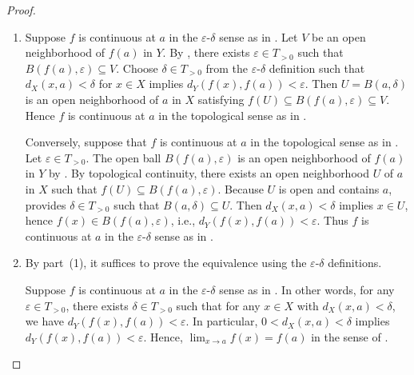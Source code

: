 \begin{proof}
    \begin{enumerate}
        \item Suppose $f$ is continuous at $a$ in the $\varepsilon$-$\delta$ sense as in . Let $V$ be an open neighborhood of $f(a)$ in $Y$. By , there exists $\varepsilon \in T_{>0}$ such that $B(f(a), \varepsilon) \subseteq V$. Choose $\delta \in T_{>0}$ from the $\varepsilon$-$\delta$ definition such that $d_X(x,a) < \delta$ for $x \in X$ implies $d_Y(f(x), f(a)) < \varepsilon$. Then $U = B(a, \delta)$ is an open neighborhood of $a$ in $X$ satisfying $f(U) \subseteq B(f(a), \varepsilon) \subseteq V$. Hence $f$ is continuous at $a$ in the topological sense as in .

        Conversely, suppose that $f$ is continuous at $a$ in the topological sense as in . Let $\varepsilon \in T_{>0}$. The open ball $B(f(a), \varepsilon)$ is an open neighborhood of $f(a)$ in $Y$ by . By topological continuity, there exists an open neighborhood $U$ of $a$ in $X$ such that $f(U) \subseteq B(f(a), \varepsilon)$. Because $U$ is open and contains $a$,  provides $\delta \in T_{>0}$ such that $B(a, \delta) \subseteq U$. Then $d_X(x,a) < \delta$ implies $x \in U$, hence $f(x) \in B(f(a), \varepsilon)$, i.e., $d_Y(f(x), f(a)) < \varepsilon$. Thus $f$ is continuous at $a$ in the $\varepsilon$-$\delta$ sense as in .

        \item By part~(1), it suffices to prove the equivalence using the $\varepsilon$-$\delta$ definitions.

        Suppose $f$ is continuous at $a$ in the $\varepsilon$-$\delta$ sense as in . In other words, for any $\varepsilon \in T_{>0}$, there exists $\delta \in T_{>0}$ such that for any $x \in X$ with $d_X(x,a) < \delta$, we have $d_Y(f(x), f(a)) < \varepsilon$. In particular, $0 < d_X(x,a) < \delta$ implies $d_Y(f(x), f(a)) < \varepsilon$. Hence, $\lim_{x \to a} f(x) = f(a)$ in the sense of .


\end{enumerate}
\end{proof}
